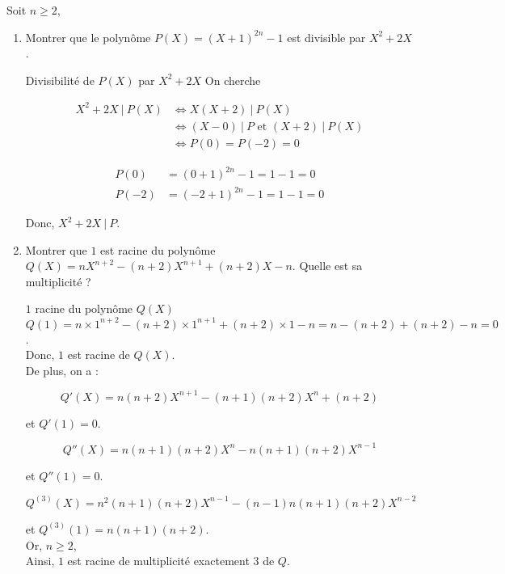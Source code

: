 \noindent Soit $n \geq 2$,

\begin{enumerate}
    \item Montrer que le polynôme $P(X) = (X + 1)^{2n} - 1$ est divisible par $X^2 + 2X$.

    \begin{theorem}[black]{Divisibilité de $P(X)$ par $X^2 + 2X$}
        On cherche

        \begin{align*}
            X^2 + 2X \ | \ P(X) &\Longleftrightarrow X(X + 2) \ | \ P(X) \\
            &\Longleftrightarrow (X - 0) \ | \ P \text{ et } (X + 2) \ | \ P(X) \\
            &\Longleftrightarrow P(0) = P(-2) = 0
        \end{align*}

        \begin{align*}
            P(0) &= (0 + 1)^{2n} - 1 = 1 - 1 = 0 \\
            P(-2) &= (-2 + 1)^{2n} - 1 = 1 - 1 = 0
        \end{align*}

        Donc, $X^2 + 2X \ | \ P$.
    \end{theorem}
    
    \item Montrer que $1$ est racine du polynôme $Q(X) = nX^{n + 2} - (n + 2)X^{n + 1} + (n + 2)X - n$. Quelle est sa multiplicité ?

    \begin{theorem}[black]{$1$ racine du polynôme $Q(X)$}
        $Q(1) = n \times 1^{n + 2} - (n + 2) \times 1^{n + 1} + (n + 2) \times 1 - n = n - (n + 2) + (n + 2) - n = 0$. \\
        Donc, $1$ est racine de $Q(X)$. \\

        \noindent De plus, on a :

        $$
            Q'(X) = n(n + 2)X^{n + 1} - (n + 1)(n + 2)X^n + (n + 2)
        $$

        \noindent et $Q'(1) = 0$.

        $$
            Q''(X) = n(n + 1)(n + 2)X^n - n(n + 1)(n + 2)X^{n - 1}
        $$

        \noindent et $Q''(1) = 0$.

        $$
            Q^{(3)}(X) = n^2(n + 1)(n + 2)X^{n - 1} - (n - 1)n(n + 1)(n + 2)X^{n - 2}
        $$

        \noindent et $Q^{(3)}(1) = n(n + 1)(n + 2)$. \\
        Or, $n \geq 2$, \\

        \noindent Ainsi, $1$ est racine de multiplicité exactement $3$ de $Q$.
        
    \end{theorem}
    
\end{enumerate}